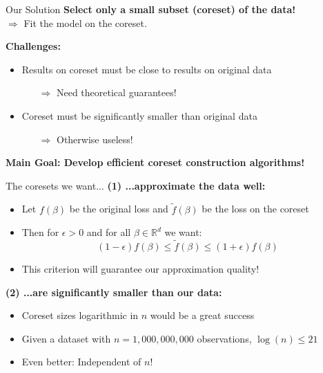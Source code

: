 \documentclass[gray]{beamer}
\begin{document}
\begin{frame}{Our Solution}
    \textbf{Select only a small subset (coreset) of the data!} \\
    $\Rightarrow$ Fit the model on the coreset.

    \vspace{\fill}

    \textbf{Challenges:}
    \begin{itemize}
        \item Results on coreset must be close to results on original data
              \begin{itemize}
                  \item[$\Rightarrow$] Need theoretical guarantees!
              \end{itemize}
        \item Coreset must be significantly smaller than original data
              \begin{itemize}
                  \item[$\Rightarrow$] Otherwise useless!
              \end{itemize}
    \end{itemize}

    \vspace{\fill}

    \textbf{Main Goal: Develop efficient coreset construction algorithms!}
\end{frame}

\begin{frame}{The coresets we want...}
    \textbf{(1) ...approximate the data well:}
    \begin{itemize}
        \item Let $f(\beta)$ be the original loss and $\tilde{f}(\beta)$
              be the loss on the coreset
        \item Then for $\epsilon > 0$ and for all $\beta \in \mathbb{R}^d$ we want:
              \begin{equation*}
                  (1 - \epsilon) f(\beta) \leq \tilde{f}(\beta) \leq (1 + \epsilon) f(\beta)
              \end{equation*}
        \item This criterion will guarantee our approximation quality!
    \end{itemize}

    \vspace{\fill}

    \textbf{(2) ...are significantly smaller than our data:}
    \begin{itemize}
        \item Coreset sizes logarithmic in $n$ would be a great success
        \item Given a dataset with $n=1,000,000,000$ observations,
              $\log(n) \leq 21$
        \item Even better: Independent of $n$!
    \end{itemize}
\end{frame}
\end{document}
